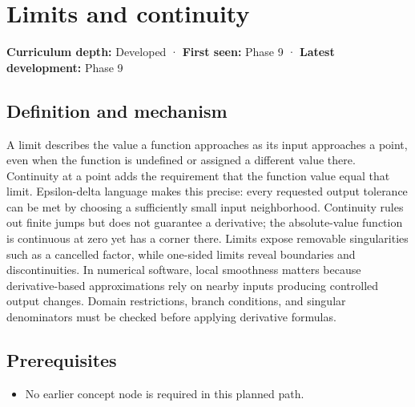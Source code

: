 \hypertarget{appendix-fecc1847f5a3}{}\label{referencestart:appendix-fecc1847f5a3}
\section{Limits and continuity}\label{appendix-fecc1847f5a3-limits-and-continuity}

\hypertarget{appendix-fecc1847f5a3-limits-and-continuity}{}

\textbf{Curriculum depth:} Developed · \textbf{First seen:} Phase 9 · \textbf{Latest development:} Phase 9

\begin{allmightroledefinition}

\subsection{Definition and mechanism}\label{appendix-fecc1847f5a3-definition-and-mechanism}

\hypertarget{appendix-fecc1847f5a3-definition-and-mechanism}{}

A limit describes the value a function approaches as its input approaches a point, even when the function is undefined or assigned a different value there. Continuity at a point adds the requirement that the function value equal that limit. Epsilon-delta language makes this precise: every requested output tolerance can be met by choosing a sufficiently small input neighborhood. Continuity rules out finite jumps but does not guarantee a derivative; the absolute-value function is continuous at zero yet has a corner there. Limits expose removable singularities such as a cancelled factor, while one-sided limits reveal boundaries and discontinuities. In numerical software, local smoothness matters because derivative-based approximations rely on nearby inputs producing controlled output changes. Domain restrictions, branch conditions, and singular denominators must be checked before applying derivative formulas.

\end{allmightroledefinition}

\subsection{Prerequisites}\label{appendix-fecc1847f5a3-prerequisites}

\hypertarget{appendix-fecc1847f5a3-prerequisites}{}

\begin{itemize}
\tightlist
\item
  No earlier concept node is required in this planned path.
\end{itemize}

